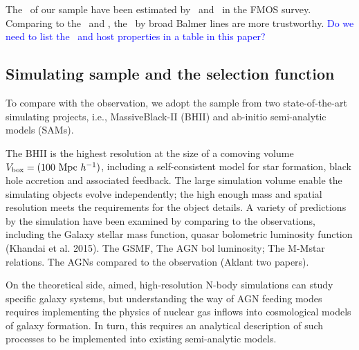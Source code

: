 \documentclass[twocolumn]{aastex62}
\begin{document}
The \mbh\ of our sample have been estimated by \halpha\ and \hbeta\ in the FMOS survey. Comparing to the \Mgii\ and \Civ, the \mbh\ by broad Balmer lines are more trustworthy.
\textcolor{blue}{Do we need to list the \mbh\ and host properties in a table in this paper?}

\subsection{Simulating sample and the selection function} 
To compare with the observation, we adopt the sample from two state-of-the-art simulating projects, i.e., MassiveBlack-II (BHII) and ab-initio semi-analytic models (SAMs).

The BHII is the highest resolution at the size of a comoving volume $V_{\rm box} = (100~{\rm Mpc}~h^{-1})$, including a self-consistent model for star formation, black hole accretion and associated feedback. The large simulation volume enable the simulating objects evolve independently; the high enough mass and spatial resolution meets the requirements for the object details. A variety of predictions by the simulation have been examined by comparing to the observations, including 
the Galaxy stellar mass function, quasar bolometric luminosity function (Khandai et al. 2015). %
The GSMF, The AGN bol luminosity; The M-Mstar relations. The AGNs compared to the observation (Aklant two papers).

On the theoretical side, aimed, high-resolution N-body simulations can study specific galaxy systems, but understanding the way of AGN feeding modes requires implementing the physics of nuclear gas inflows into cosmological models of galaxy formation. In turn, this requires an analytical description of such processes to be implemented into existing semi-analytic models.
\end{document}
